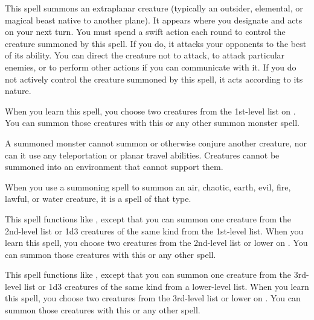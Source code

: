 \hypertarget{spell:summon monster}{}
\spelldur{\durshort \dismissable}
\spellline
\spelleffect This spell summons an extraplanar creature (typically an outsider, elemental, or magical beast native to another plane). It appears where you designate and acts on your next turn. You must spend a swift action each round to control the creature summoned by this spell. If you do, it attacks your opponents to the best of its ability. You can direct the creature not to attack, to attack particular enemies, or to perform other actions if you can communicate with it. If you do not actively control the creature summoned by this spell, it acts according to its nature.
\par When you learn this spell, you choose two creatures from the 1st-level list on . You can summon those creatures with this or any other summon monster spell.
\par A summoned monster cannot summon or otherwise conjure another creature, nor can it use any teleportation or planar travel abilities. Creatures cannot be summoned into an environment that cannot support them.
\par When you use a summoning spell to summon an air, chaotic, earth, evil, fire, lawful, or water creature, it is a spell of that type.

\spelldur{\durshort \dismissable}
\spellline
\spelleffect This spell functions like , except that you can summon one creature from the 2nd-level list or 1d3 creatures of the same kind from the 1st-level list. When you learn this spell, you choose two creatures from the 2nd-level list or lower on . You can summon those creatures with this or any other  spell.

\spelldur{\durshort \dismissable}
\spellline
\spelleffect This spell functions like , except that you can summon one creature from the 3rd-level list or 1d3 creatures of the same kind from a lower-level list. When you learn this spell, you choose two creatures from the 3rd-level list or lower on . You can summon those creatures with this or any other  spell.

